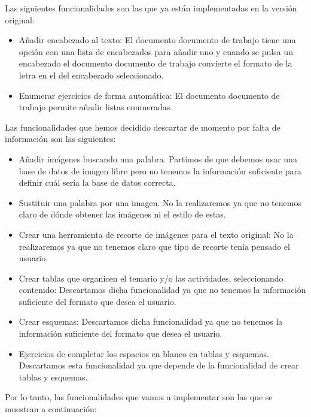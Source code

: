  Las siguientes funcionalidades son las que ya están implementadas en la versión original:
  \begin{itemize}
    \item Añadir encabezado al texto: El documento documento de trabajo tiene una opción con una lista de encabezados para añadir uno y cuando se pulsa un encabezado el documento documento de trabajo convierte el formato de la letra en el del encabezado seleccionado. 
    \item Enumerar ejercicios de forma automática: El documento documento de trabajo permite añadir listas enumeradas.
  \end{itemize}
Las funcionalidades que hemos decidido descartar de momento por falta de información son las siguientes:
\begin{itemize}
  \item Añadir imágenes buscando una palabra. Partimos de que debemos usar una base de datos de imagen libre pero no tenemos la información suficiente para definir cuál sería la base de datos correcta.
  \item Sustituir una palabra por una imagen. No la realizaremos ya que no tenemos claro de dónde obtener las imágenes ni el estilo de estas.
  \item Crear una herramienta de recorte de imágenes para el texto original: No la realizaremos ya que no tenemos claro que tipo de recorte tenía pensado el usuario. 
  \item Crear tablas que organicen el temario y/o las actividades, seleccionando contenido: Descartamos dicha funcionalidad ya que no tenemos la información suficiente del formato que desea el usuario.
  \item Crear esquemas: Descartamos dicha funcionalidad ya que no tenemos la información suficiente del formato que desea el usuario.
  \item Ejercicios de completar los espacios en blanco en tablas y esquemas. Descartamos esta funcionalidad ya que depende de la funcionalidad de crear tablas y esquemas. 
\end{itemize}

Por lo tanto, las funcionalidades que vamos a implementar son las que se muestran a continuación:


